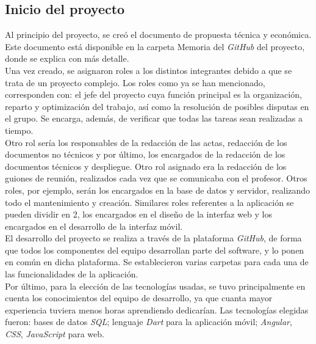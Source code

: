 \documentclass{article}
\begin{document}
\subsection{Inicio del proyecto}
Al principio del proyecto, se creó el documento de propuesta técnica y económica. Este documento está disponible en la carpeta Memoria del \textit{GitHub} del proyecto, donde se explica con más detalle.\\
Una vez creado, se asignaron roles a los distintos integrantes debido a que se trata de un proyecto complejo. Los roles como ya se han mencionado, corresponden con: el jefe del proyecto cuya función principal es la organización, reparto y optimización del trabajo, así como la resolución de posibles disputas en el grupo. 
Se encarga, además, de verificar que todas las tareas sean realizadas a tiempo. \\
\hfill \break
Otro rol sería los responsables de la redacción de las actas, redacción de los documentos no técnicos y por último, los encargados de la redacción de los documentos técnicos y despliegue. Otro rol asignado era la redacción de los guiones de reunión, realizados cada vez que se comunicaba con el profesor. Otros roles, por ejemplo, serán los encargados en la base de datos y servidor, realizando todo el mantenimiento y creación. Similares roles referentes a la aplicación se pueden dividir en 2, los encargados en el diseño de la interfaz web y los encargados en el desarrollo de la interfaz móvil. \\
\hfill \break
El desarrollo del proyecto se realiza a través de la plataforma \textit{GitHub}, de forma que todos los componentes del equipo desarrollan parte del software, y lo ponen en común en dicha plataforma. Se establecieron varias carpetas para cada una de las funcionalidades de la aplicación. \\
Por último, para la elección de las tecnologías usadas, se tuvo principalmente en cuenta los conocimientos del equipo de desarrollo, ya que cuanta mayor experiencia tuviera menos horas aprendiendo dedicarían. Las tecnologías elegidas fueron: bases de datos \textit{SQL}; lenguaje \textit{Dart} para la aplicación móvil; \textit{Angular}, \textit{CSS}, \textit{JavaScript} para web.
\end{document}
